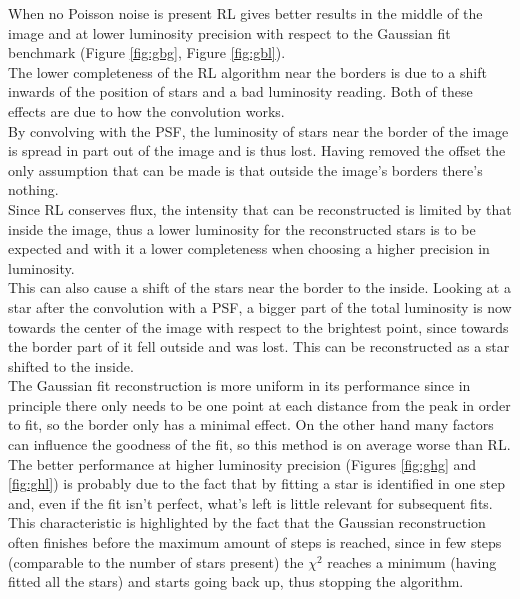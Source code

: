 \documentclass[a4paper]{article}
\begin{document}
	\begin{multicols}{2}
			When no Poisson noise is present RL gives better results in the middle of the image and at lower luminosity precision with respect to the Gaussian fit benchmark (Figure \ref{fig:gbg}, Figure \ref{fig:gbl}).\\
			
			The lower completeness of the RL algorithm near the borders is due to a shift inwards of the position of stars and a bad luminosity reading. Both of these effects are due to how the convolution works.\\
			
			By convolving with the PSF, the luminosity of stars near the border of the image is spread in part out of the image and is thus lost. Having removed the offset the only assumption that can be made is that outside the image's borders there's nothing.\\
			
			Since RL conserves flux, the intensity that can be reconstructed is limited by that inside the image, thus a lower luminosity for the reconstructed stars is to be expected and with it a lower completeness when choosing a higher precision in luminosity.\\
			This can also cause a shift of the stars near the border to the inside. Looking at a star after the convolution with a PSF, a bigger part of the total luminosity is now towards the center of the image with respect to the brightest point, since towards the border part of it fell outside and was lost. This can be reconstructed as a star shifted to the inside.\\
			
			The Gaussian fit reconstruction is more uniform in its performance since in principle there only needs to be one point at each distance from the peak in order to fit, so the border only has a minimal effect. On the other hand many factors can influence the goodness of the fit, so this method is on average worse than RL.\\
			The better performance at higher luminosity precision (Figures \ref{fig:ghg} and \ref{fig:ghl}) is probably due to the fact that by fitting a star is identified in one step and, even if the fit isn't perfect, what's left is little relevant for subsequent fits. This characteristic is highlighted by the fact that the Gaussian reconstruction often finishes before the maximum amount of steps is reached, since in few steps (comparable to the number of stars present) the $\chi^2$ reaches a minimum (having fitted all the stars) and starts going back up, thus stopping the algorithm.\\
			

\end{multicols}
\end{document}
